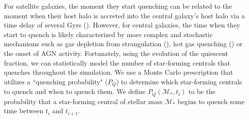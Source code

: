 For satellite galaxies, the moment they start quenching can be
related to the moment when their host halo is accreted 
into the central galaxy's host halo via a time delay of 
several Gyrs (\citealt{Wetzel:2013aa}). 
However, for central galaxies, the time when they start to 
quench is likely characterized by more complex and stochastic 
mechanisms such as gas depletion from strangulation (\citealt{Peng:2015aa}), 
hot gas quenching (\citealt{Gabor:2010aa,Gabor:2012aa,Gabor:2015aa}) or 
the onset of AGN activity. Fortunately, using the evolution of the quiescent fraction, 
we can statistically model the number of star-forming centrals 
that quenches throughout the simulation. We use a Monte Carlo 
prescription that utilizes a ``quenching probability" ($P_Q$) 
to determine which star-forming centrals to quench and when to 
quench them. 
We define $P_Q(\mathcal{M}_*, t_i)$ to be the probability that 
a star-forming central of stellar mass $\mathcal{M}_*$ begins 
to quench some time between $t_i$ and $t_{i+1}$. 

